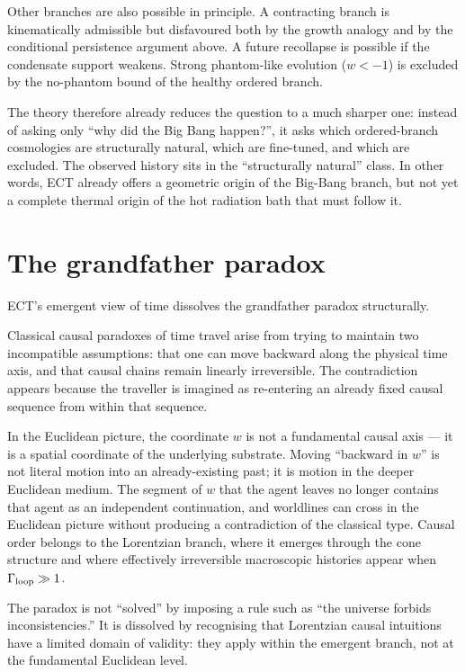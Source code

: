 \documentclass[11pt,a4paper]{article}
\begin{document}
Other branches are also possible in principle.  A contracting
branch is kinematically admissible but disfavoured both by the
growth analogy and by the conditional persistence argument above.  A future recollapse is possible if the
condensate support weakens.  Strong phantom-like evolution
($w<-1$) is excluded by the no-phantom bound of the healthy
ordered branch.

The theory therefore already reduces the question to a much
sharper one: instead of asking only ``why did the Big Bang
happen?'', it asks which ordered-branch cosmologies are
structurally natural, which are fine-tuned, and which are
excluded.  The observed history sits in the ``structurally
natural'' class.  In other words, ECT already offers a geometric
origin of the Big-Bang branch, but not yet a complete thermal
origin of the hot radiation bath that must follow it.

\section{The grandfather paradox}

ECT's emergent view of time dissolves the grandfather paradox structurally.

Classical causal paradoxes of time travel arise from trying to maintain two incompatible assumptions: that one can move backward along the physical time axis, and that causal chains remain linearly irreversible. The contradiction appears because the traveller is imagined as re-entering an already fixed causal sequence from within that sequence.

In the Euclidean picture, the coordinate $w$ is not a fundamental causal axis --- it is a spatial coordinate of the underlying substrate. Moving ``backward in $w$'' is not literal motion into an already-existing past; it is motion in the deeper Euclidean medium. The segment of $w$ that the agent leaves no longer contains that agent as an independent continuation, and worldlines can cross in the Euclidean picture without producing a contradiction of the classical type. Causal order belongs to the Lorentzian branch, where it emerges through the cone structure and where effectively irreversible macroscopic histories appear when $\Gamma_{\rm loop} \gg 1$.

The paradox is not ``solved'' by imposing a rule such as ``the universe forbids inconsistencies.'' It is dissolved by recognising that Lorentzian causal intuitions have a limited domain of validity: they apply within the emergent branch, not at the fundamental Euclidean level.
\end{document}
